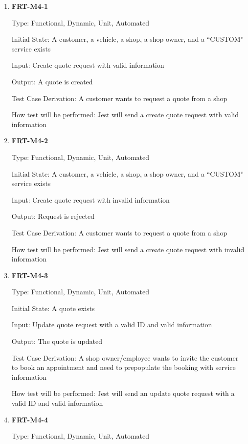 \documentclass[12pt, titlepage]{article}
\begin{document}
\begin{enumerate}

	\item \textbf{FRT-M4-1}

	      Type: Functional, Dynamic, Unit, Automated

	      Initial State: A customer, a vehicle, a shop, a shop owner, and a ``CUSTOM'' service exists

	      Input: Create quote request with valid information

	      Output: A quote is created

	      Test Case Derivation: A customer wants to request a quote from a shop

	      How test will be performed: Jest will send a create quote request with valid information

	\item \textbf{FRT-M4-2}

	      Type: Functional, Dynamic, Unit, Automated

	      Initial State: A customer, a vehicle, a shop, a shop owner, and a ``CUSTOM'' service exists

	      Input: Create quote request with invalid information

	      Output: Request is rejected

	      Test Case Derivation: A customer wants to request a quote from a shop

	      How test will be performed: Jest will send a create quote request with invalid information

	\item \textbf{FRT-M4-3}

	      Type: Functional, Dynamic, Unit, Automated

	      Initial State: A quote exists

	      Input: Update quote request with a valid ID and valid information

	      Output: The quote is updated

	      Test Case Derivation: A shop owner/employee wants to invite the customer to book an appointment and
	      need to prepopulate the booking with service information

	      How test will be performed: Jest will send an update quote request with a valid ID and valid
	      information

	\item \textbf{FRT-M4-4}

	      Type: Functional, Dynamic, Unit, Automated


\end{enumerate}
\end{document}
